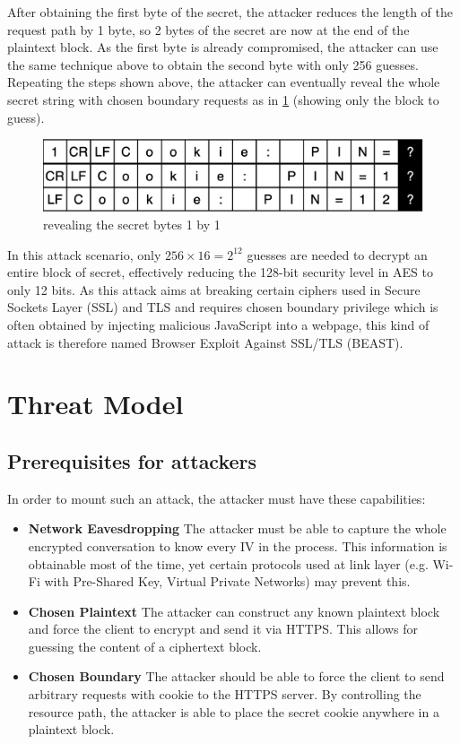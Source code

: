 \documentclass{acm_proc_article-sp}
\begin{document}
After obtaining the first byte of the secret, the attacker reduces the length of the request path by 1
byte, so 2 bytes of the secret are now at the end of the plaintext block. As the first byte is already
compromised, the attacker can use the same technique above to obtain the second byte with only
256 guesses. Repeating the steps shown above, the attacker can eventually reveal the whole secret
string with chosen boundary requests as in \ref{fig:reveal} (showing only the block to guess).
\begin{figure}[htb]
    \centering
    \includegraphics[keepaspectratio, width=\linewidth]{./figures/revealing.png}
    \caption{revealing the secret bytes 1 by 1}
    \label{fig:reveal}
\end{figure}

In this attack scenario, only $256\times16 = 2^{12}$ guesses are needed to decrypt an entire block 
of secret, effectively reducing the 128-bit security level in AES to only 12 bits. As this attack aims at
breaking certain ciphers used in Secure Sockets Layer (SSL) and TLS and requires chosen
boundary privilege which is often obtained by injecting malicious JavaScript into a webpage,
this kind of attack is therefore named Browser Exploit Against SSL/TLS (BEAST).

\section{Threat Model}
\subsection{Prerequisites for attackers}
In order to mount such an attack, the attacker must have these capabilities:
\begin{itemize}
    \item \textbf{Network Eavesdropping} The attacker must be able to capture the whole 
    encrypted conversation to know every IV in the process. This information is obtainable most
    of the time, yet certain protocols used at link layer (e.g. Wi-Fi with Pre-Shared Key, Virtual Private
    Networks) may prevent this.
    \item \textbf{Chosen Plaintext} The attacker can construct any known plaintext block and force the
    client to encrypt and send it via HTTPS. This allows for guessing the content of a ciphertext block.
    \item \textbf{Chosen Boundary} The attacker should be able to force the client to send arbitrary
    requests with cookie to the HTTPS server. By controlling the resource path, the attacker is able to
    place the secret cookie anywhere in a plaintext block.
\end{itemize}
\end{document}
